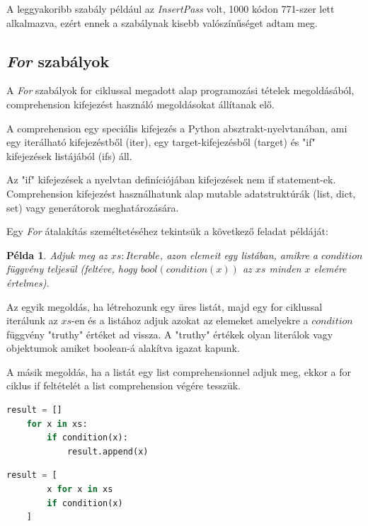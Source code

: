 A leggyakoribb szabály például az \emph{InsertPass} volt, 1000 kódon 771-szer lett alkalmazva,
ezért ennek a szabálynak kisebb valószínűséget adtam meg.

\subsection{\emph{For} szabályok}

A \emph{For} szabályok for ciklussal megadott alap programozási tételek megoldásából,
comprehension kifejezést használó megoldásokat állítanak elő.

A comprehension egy speciális kifejezés a Python absztrakt-nyelvtanában, ami
egy iterálható kifejezéstből (iter), egy target-kifejezésből (target)
és "if" kifejezések listájából (ifs) áll.

Az "if" kifejezések a nyelvtan definíciójában kifejezések nem if statement-ek.
Comprehension kifejezést használhatunk alap
mutable adatstruktúrák (list, dict, set) vagy generátorok meghatározására.

Egy \emph{For} átalakítás személtetéséhez tekintsük a következő feladat példáját:

\newtheorem{example}{Példa}
\begin{example}
Adjuk meg az $xs: Iterable$, azon elemeit egy listában,
amikre a $condition$ függvény teljesül
(feltéve, hogy $bool(condition(x))$ az $xs$ minden $x$ elemére értelmes).
\end{example}

Az egyik megoldás, ha létrehozunk egy üres listát,
majd egy for ciklussal iterálunk az $xs$-en és
a listához adjuk azokat az elemeket amelyekre a $condition$ függvény "truthy" értéket ad vissza.
A "truthy" értékek olyan literálok vagy objektumok amiket boolean-á alakítva igazat kapunk.

A másik megoldás, ha a listát egy list comprehensionnel adjuk meg,
ekkor a for ciklus if feltételét a list comprehension végére tesszük.

\noindent
\begin{minipage}[t]{.48\textwidth}
\begin{lstlisting}[language={Python}]
	result = []
	for x in xs:
		if condition(x):
			result.append(x)
\end{lstlisting}
\end{minipage}
\hfill
\begin{minipage}[t]{.48\textwidth}
\begin{lstlisting}[language={Python}]
	result = [
		x for x in xs
		if condition(x)
	]
\end{lstlisting}
\end{minipage}

